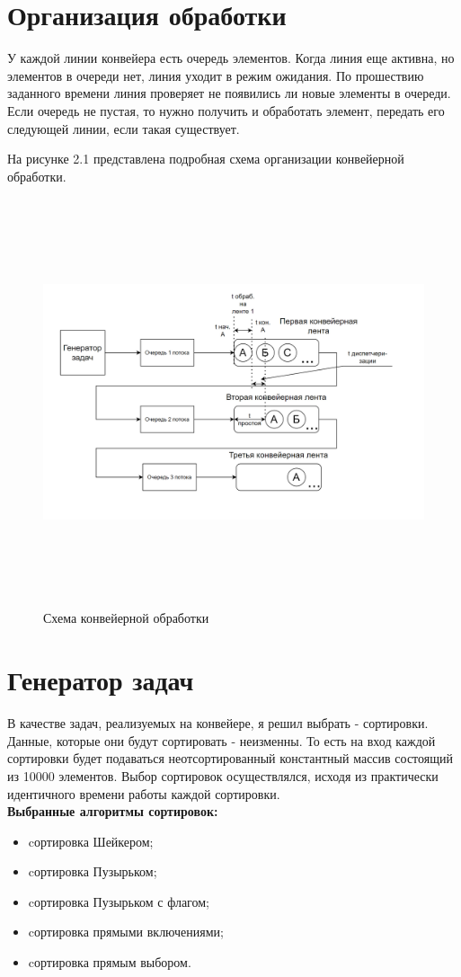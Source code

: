 \documentclass[12pt]{report}
\begin{document}
\section{Организация обработки}
У каждой линии конвейера есть очередь элементов. Когда линия еще активна, но элементов в очереди нет, линия уходит в режим ожидания.
По прошествию заданного времени линия проверяет не появились ли новые элементы в очереди. Если очередь не пустая, то нужно получить и обработать элемент, передать его следующей линии, если такая существует.
\begin{center}
	На рисунке {2.1} представлена подробная схема организации конвейерной обработки.
\end{center}


\begin{figure}[pt]
	\centering
	\includegraphics[height = 12cm,height=11cm]{Conveyr.jpg}
	\caption{Схема конвейерной обработки}
	\label{fig:mpr}
\end{figure}
\newpage

\section{Генератор задач}
В качестве задач, реализуемых на конвейере, я решил выбрать - сортировки. Данные, которые они будут сортировать - неизменны. То есть на вход каждой сортировки будет подаваться неотсортированный константный массив состоящий из 10000 элементов. Выбор сортировок осуществлялся, исходя из практически идентичного времени работы каждой сортировки.
\newline
\\
\textbf{Выбранные алгоритмы сортировок:}
\begin{itemize}
	\item cортировка Шейкером;
	\item cортировка Пузырьком;
	\item cортировка Пузырьком с флагом;
	\item cортировка прямыми включениями;
	\item cортировка прямым выбором.
\end{itemize}
\end{document}
